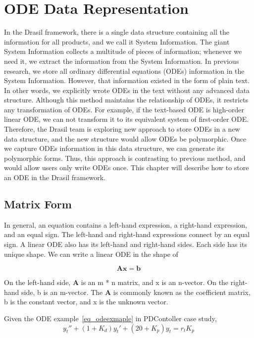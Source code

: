 \chapter{ODE Data Representation}
In the Drasil framework, there is a single data structure containing all the information for all products, and we call it System Information. The giant System Information collects a multitude of pieces of information; whenever we need it, we extract the information from the System Information. In previous research, we store all ordinary differential equations (ODEs) information in the System Information. However, that information existed in the form of plain text. In other words, we explicitly wrote ODEs in the text without any advanced data structure. Although this method maintains the relationship of ODEs, it restricts any transformation of ODEs. For example, if the text-based ODE is high-order linear ODE, we can not transform it to its equivalent system of first-order ODE. Therefore, the Drasil team is exploring new approach to store ODEs in a new data structure, and the new structure would allow ODEs be polymorphic. Once we capture ODEs information in this data structure, we can generate its polymorphic forms. Thus, this approach is contrasting to previous method, and would allow users only write ODEs once. This chapter will describe how to store an ODE in the Drasil framework. 

\section{Matrix Form}
In general, an equation contains a left-hand expression, a right-hand expression, and an equal sign. The left-hand and right-hand expressions connect by an equal sign. A linear ODE also has its left-hand and right-hand sides. Each side has its unique shape. We can write a linear ODE in the shape of

\begin{equation} \label{eq_matrixform}
	\boldsymbol{Ax} = \boldsymbol{b}
\end{equation}

On the left-hand side, \textbf{A} is an m * n matrix, and x is an n-vector. On the right-hand side, b is an m-vector. The \textbf{A} is commonly known as the coefficient matrix, b is the constant vector, and x is the unknown vector.

Given the ODE example~\ref{eq_odeexmaple} in PDContoller case study,
\begin{equation} \label{eq_odeexmaple}
	y_t'' + (1 + K_d)y_t' + (20 + K_p)y_t = r_t K_p
\end{equation}


